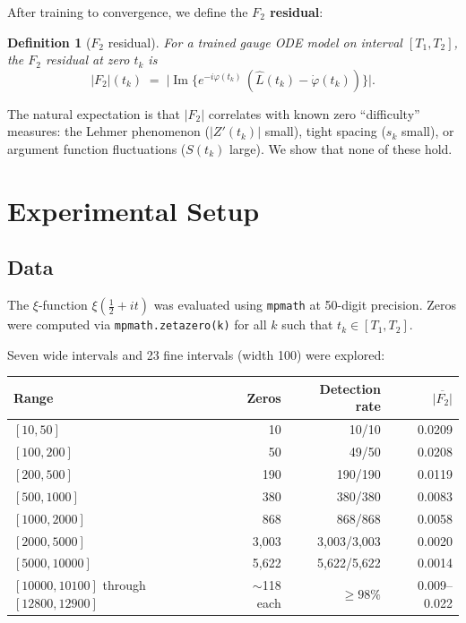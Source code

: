 \documentclass[11pt,a4paper]{article}
\newtheorem{definition}[theorem]{Definition}
\newcommand{\Ftwo}{|F_2|}
\begin{document}
After training to convergence, we define the \textbf{$F_2$ residual}:

\begin{definition}[$F_2$ residual]
For a trained gauge ODE model on interval $[T_1, T_2]$, the $F_2$ residual at zero $t_k$ is
\[
  \Ftwo(t_k) \;=\; \bigl|\operatorname{Im}\!\bigl\{e^{-i\varphi(t_k)}\,(\hat{L}(t_k) - \dot{\varphi}(t_k))\bigr\}\bigr|.
\]
\end{definition}

The natural expectation is that $\Ftwo$ correlates with known zero ``difficulty'' measures:
the Lehmer phenomenon ($|Z'(t_k)|$ small), tight spacing ($s_k$ small),
or argument function fluctuations ($S(t_k)$ large).
We show that none of these hold.

\section{Experimental Setup}

\subsection{Data}

The $\xi$-function $\xi(\tfrac{1}{2}+it)$ was evaluated using \texttt{mpmath}
at 50-digit precision.
Zeros were computed via \texttt{mpmath.zetazero(k)} for all $k$ such that
$t_k \in [T_1, T_2]$.

Seven wide intervals and 23 fine intervals (width 100) were explored:

\begin{center}
\begin{tabular}{lrrr}
\toprule
\textbf{Range} & \textbf{Zeros} & \textbf{Detection rate} & $\overline{\Ftwo}$ \\
\midrule
$[10, 50]$       & 10     & 10/10     & 0.0209 \\
$[100, 200]$     & 50     & 49/50     & 0.0208 \\
$[200, 500]$     & 190    & 190/190   & 0.0119 \\
$[500, 1000]$    & 380    & 380/380   & 0.0083 \\
$[1000, 2000]$   & 868    & 868/868   & 0.0058 \\
$[2000, 5000]$   & 3{,}003  & 3{,}003/3{,}003 & 0.0020 \\
$[5000, 10000]$  & 5{,}622  & 5{,}622/5{,}622 & 0.0014 \\
\midrule
$[10000, 10100]$ through $[12800, 12900]$ & $\sim$118 each & $\geq 98\%$ & 0.009--0.022 \\
\bottomrule
\end{tabular}
\end{center}
\end{document}
